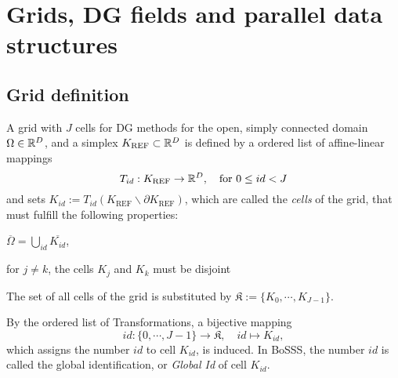 \section{Grids, DG fields and parallel data structures}

\subsection{Grid definition}

\begin{myDef}[Grid]A grid
with $J$ cells
for DG methods for the open, simply connected domain $\Omega \in \mathbb{R}^D$,
and a simplex $K_{\textrm{REF}} \subset \mathbb{R}^D$
is defined by a ordered list of affine-linear mappings
\[
 T_{id} :  K_\textrm{REF} \rightarrow \mathbb{R}^D, \quad \textrm{for } 0 \leq id < J
\]
and sets $K_{id} := T_{id}(K_\textrm{REF} \backslash \partial K_\textrm{REF})$,
which are called the \emph{cells} of the grid,
that must fulfill the following properties:
\begin{packed_itemize}
 \item $\overline{\Omega} = \bigcup_{id} \overline{K_{id}}$,
 \item for $j \neq k$, the cells $K_j$ and $K_k$ must be disjoint
\end{packed_itemize}
\label{def-grid}
\end{myDef}

\begin{myNot}
The set of all cells of the grid is substituted by $\mathfrak{K} := \{K_0,\cdots,K_{J-1} \}$.
\end{myNot}

\begin{myRem}
By the ordered list of Transformations, a bijective mapping
\[
  id : \{ 0, \cdots , J-1 \} \rightarrow \mathfrak{K}, \quad id \mapsto K_{id},
\]
which assigns the number $id$ to cell $K_{id}$,
is induced. In BoSSS, the number $id$ is called the global identification,
or \emph{Global Id} of cell $K_{id}$.
\label{def-globalid}
\end{myRem}

